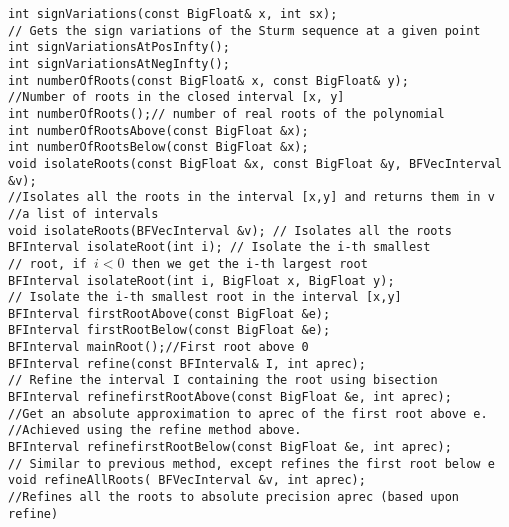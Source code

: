 \begin{progb}{
\> \tt  int signVariations(const BigFloat\& x, int sx); \\
\>\> // Gets the sign variations of the Sturm sequence at a given point\\
\> \tt  int signVariationsAtPosInfty();\\
\> \tt  int signVariationsAtNegInfty();\\
\> \tt  int numberOfRoots(const BigFloat\& x, const BigFloat\& y);\\
\> \> //Number of roots in the closed interval [x, y] \\
\> \tt  int numberOfRoots();// number of real roots of the polynomial\\
\> \tt  int numberOfRootsAbove(const BigFloat \&x);\\
\> \tt  int numberOfRootsBelow(const BigFloat \&x);\\
\> \tt  void isolateRoots(const BigFloat \&x, const BigFloat \&y,
                    BFVecInterval \&v);\\
\> \> //Isolates all the roots in the interval [x,y] and returns them in v\\
\> \> //a list of intervals\\
\> \tt  void isolateRoots(BFVecInterval \&v); \rm// Isolates all the roots\\
\> \tt  BFInterval isolateRoot(int i); \rm// Isolate the i-th smallest\\
\> \> // root, if $i < 0$ then we get the i-th largest root\\
\> \tt  BFInterval isolateRoot(int i, BigFloat x, BigFloat y);\\
\> \> // Isolate the i-th smallest root in the interval [x,y]\\
\> \tt  BFInterval firstRootAbove(const BigFloat \&e);\\
\> \tt  BFInterval firstRootBelow(const BigFloat \&e);\\
\> \tt  BFInterval mainRoot();//First root above 0\\
\> \tt	BFInterval refine(const BFInterval\& I, int aprec);\\
\> \> // Refine the interval \texttt{I} containing the root using bisection\\
\> \tt  BFInterval refinefirstRootAbove(const BigFloat \&e, int aprec);\\
\> \> //Get an absolute approximation to aprec of the first root above \texttt{e}.\\
\> \> //Achieved using the refine method above.\\
\> \tt  BFInterval refinefirstRootBelow(const BigFloat \&e, int aprec);\\
\> \> // Similar to previous method, except refines the first root below \texttt{e}\\
\> \tt  void refineAllRoots( BFVecInterval \&v, int aprec);\\
\> \> //Refines all the roots to absolute precision aprec (based upon refine)\\
\> \tt
}\end{progb}

